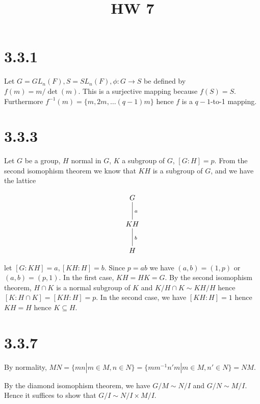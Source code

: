 \documentclass{article}
\title{HW 7}
\date{}
\def\inv{{-1}}
\begin{document}
\maketitle





\section*{3.3.1}

Let $G = GL_n(F), S = SL_n(F), \phi : G \to S$ be defined by $f(m) = m / \det(m)$. This is a surjective mapping because $f(S) = S$. Furthermore $f^\inv(m) = \{m, 2m, \ldots (q-1)m\}$ hence $f$ is a $q-1$-to-1 mapping. 

\section*{3.3.3}

Let $G$ be a group, $H$ normal in $G$, $K$ a subgroup of $G$, $[G:H] = p$. From the second isomophism theorem we know that $KH$ is a subgroup of $G$, and we have the lattice 

$$
\xymatrix{
G \ar@{-}[d]^{a} \\
KH \ar@{-}[d]^{b} \\
H
}
$$

let $[G:KH] = a, [KH:H] = b$. Since $p = ab$ we have $(a, b) = (1, p)$ or $(a, b) = (p, 1)$. In the first case, $KH = HK = G$. By the second isomophism theorem, $H \cap K$ is a normal subgroup of $K$ and $K / H \cap K \sim KH / H$ hence $[K : H \cap K] = [KH : H] = p$. In the second case, we have $[KH : H] = 1$ hence $KH = H$ hence $K \subseteq H$.

\section*{3.3.7}

By normality, $MN = \{ mn | m \in M, n \in N\} = \{ m m^\inv n' m | m \in M, n' \in N \} = NM$.


By the diamond isomophism theorem, we have $G / M \sim N / I$ and $G / N \sim M / I$. Hence it suffices to show that $G / I \sim N / I \times M / I$.
\end{document}

